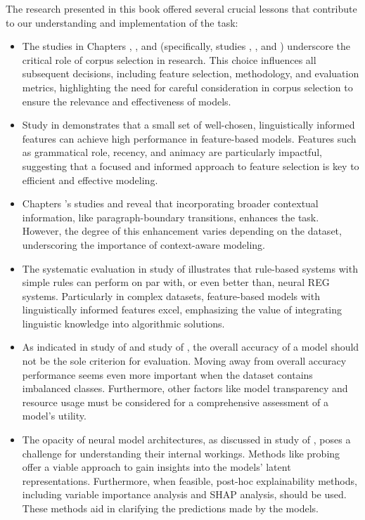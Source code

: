 The research presented in this book offered several crucial lessons that contribute to our understanding and implementation of the \context task:

\begin{itemize}
	\item The studies in Chapters \4, \5, and \7 (specifically, studies \studA, \studC, and \studF) underscore the critical role of corpus selection in \context research. This choice influences all subsequent decisions, including feature selection, methodology, and evaluation metrics, highlighting the need for careful consideration in corpus selection to ensure the relevance and effectiveness of \context models.
	
	\item Study \studB in  demonstrates that a small set of well-chosen, linguistically informed features can achieve high performance in feature-based models. Features such as grammatical role, recency, and animacy are particularly impactful, suggesting that a focused and informed approach to feature selection is key to efficient and effective modeling.
	
	\item Chapters \6's studies \studD and \studE reveal that incorporating broader contextual information, like paragraph-boundary transitions, enhances the \context task. However, the degree of this enhancement varies depending on the dataset, underscoring the importance of context-aware modeling.
	
	\item  The systematic evaluation in study \studF of  illustrates that rule-based systems with simple rules can perform on par with, or even better than, neural REG systems. Particularly in complex datasets, feature-based models with linguistically informed features excel, emphasizing the value of integrating linguistic knowledge into algorithmic solutions.
	
	\item As indicated in study \studA of  and study \studF of , the overall accuracy of a model should not be the sole criterion for evaluation. Moving away from overall accuracy performance seems even more important when the dataset contains imbalanced classes. Furthermore, other factors like model transparency and resource usage must be considered for a comprehensive assessment of a model's utility.
	
	\item 	The opacity of neural model architectures, as discussed in study \studG of , poses a challenge for understanding their internal workings. Methods like probing offer a viable approach to gain insights into the models' latent representations. Furthermore, when feasible, post-hoc explainability methods, including variable importance analysis and SHAP analysis, should be used. These methods aid in clarifying the predictions made by the models.
	
\end{itemize}

